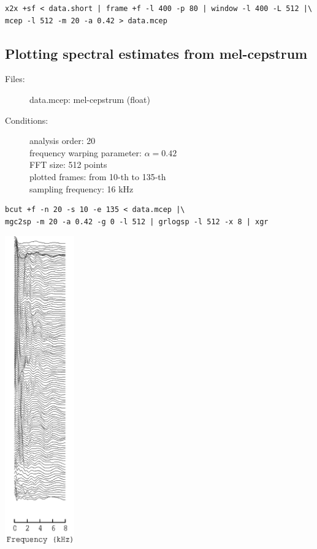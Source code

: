 \documentclass[a4paper,10pt]{article}
\begin{document}
\begin{verbatim}
x2x +sf < data.short | frame +f -l 400 -p 80 | window -l 400 -L 512 |\
mcep -l 512 -m 20 -a 0.42 > data.mcep
\end{verbatim}

\subsection{Plotting spectral estimates from mel-cepstrum}

\begin{description}
\item[Files:]
  data.mcep: mel-cepstrum (float)
\item[Conditions:]
  analysis order: 20\\
  frequency warping parameter: $\alpha = 0.42$\\
  FFT size: 512 points\\
  plotted frames: from 10-th to 135-th\\
  sampling frequency: 16 kHz
\end{description}

\begin{verbatim}
bcut +f -n 20 -s 10 -e 135 < data.mcep |\
mgc2sp -m 20 -a 0.42 -g 0 -l 512 | grlogsp -l 512 -x 8 | xgr
\end{verbatim}

\includegraphics[width=3cm]{eps/data.mcep.grlogsp.eps}
\end{document}
